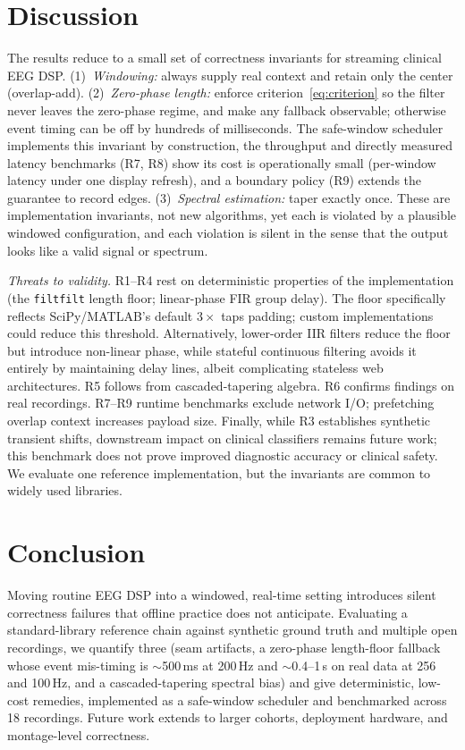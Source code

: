 \documentclass[conference]{IEEEtranSPMB}
\begin{document}
\section{Discussion}
The results reduce to a small set of correctness invariants for streaming clinical EEG DSP\@.
(1)~\emph{Windowing:} always supply real context and retain only the center (overlap-add).
(2)~\emph{Zero-phase length:} enforce criterion~\eqref{eq:criterion} so the filter never leaves
the zero-phase regime, and make any fallback observable; otherwise event timing can be off by
hundreds of milliseconds. The safe-window scheduler implements this invariant by construction, the
throughput and directly measured latency benchmarks (R7, R8) show its cost is operationally small
(per-window latency under one display refresh), and a boundary policy (R9) extends the guarantee to
record edges. (3)~\emph{Spectral estimation:} taper exactly once. These are
implementation invariants, not new algorithms, yet each is violated by a plausible windowed
configuration, and each violation is silent in the sense that the output looks like a valid
signal or spectrum.

\emph{Threats to validity.} R1--R4 rest on deterministic properties of the implementation (the
\texttt{filtfilt} length floor; linear-phase FIR group delay). The floor
specifically reflects SciPy/MATLAB's default $3\times$ taps padding; custom implementations 
could reduce this threshold. Alternatively, lower-order IIR filters reduce the floor 
but introduce non-linear phase, while stateful continuous filtering avoids it entirely 
by maintaining delay lines, albeit complicating stateless web architectures.
R5 follows from cascaded-tapering algebra. R6 confirms findings on real recordings.
R7--R9 runtime benchmarks exclude network I/O; prefetching overlap context increases payload size.
Finally, while R3 establishes synthetic transient shifts, downstream impact on clinical
classifiers remains future work; this benchmark does not prove improved diagnostic accuracy or
clinical safety. We evaluate one reference implementation, but the invariants are common to widely
used libraries.

\section{Conclusion}
Moving routine EEG DSP into a windowed, real-time setting introduces silent correctness failures
that offline practice does not anticipate. Evaluating a standard-library reference chain against
synthetic ground truth and multiple open recordings, we quantify three (seam artifacts, a
zero-phase length-floor fallback whose event mis-timing is $\sim$500\,ms at 200\,Hz and
$\sim$0.4--1\,s on real data at 256 and 100\,Hz, and a cascaded-tapering spectral bias) and give deterministic,
low-cost remedies, implemented as a safe-window scheduler and benchmarked across 18 recordings.
Future work extends to larger cohorts, deployment hardware, and montage-level correctness.
\end{document}
